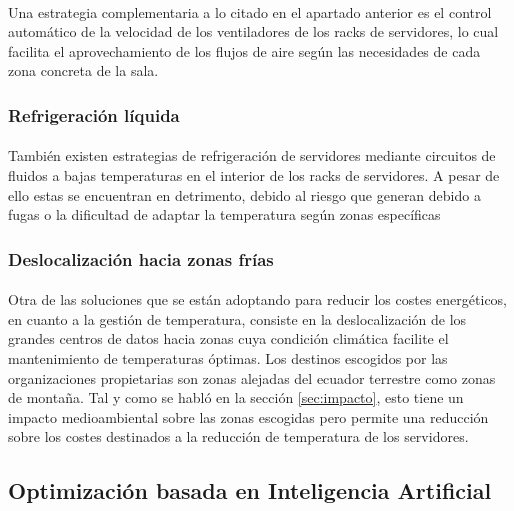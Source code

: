 \documentclass[10pt]{article}
\begin{document}
				\paragraph{}
				Una estrategia complementaria a lo citado en el apartado anterior es el control automático de la velocidad de los ventiladores de los racks de servidores, lo cual facilita el aprovechamiento de los flujos de aire según las necesidades de cada zona concreta de la sala.

			\subsubsection{Refrigeración líquida}

				\paragraph{}
				También existen estrategias de refrigeración de servidores mediante circuitos de fluidos a bajas temperaturas en el interior de los racks de servidores. A pesar de ello estas se encuentran en detrimento, debido al riesgo que generan debido a fugas o la dificultad de adaptar la temperatura según zonas específicas

			\subsubsection{Deslocalización hacia zonas frías}

				\paragraph{}
				Otra de las soluciones que se están adoptando para reducir los costes energéticos, en cuanto a la gestión de temperatura, consiste en la deslocalización de los grandes centros de datos hacia zonas cuya condición climática facilite el mantenimiento de temperaturas óptimas. Los destinos escogidos por las organizaciones propietarias son zonas alejadas del ecuador terrestre como zonas de montaña. Tal y como se habló en la sección \ref{sec:impacto}, esto tiene un impacto medioambiental sobre las zonas escogidas pero permite una reducción sobre los costes destinados a la reducción de temperatura de los servidores.

		\subsection{Optimización basada en Inteligencia Artificial}
\end{document}
